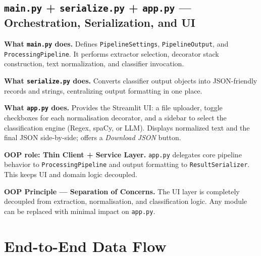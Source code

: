\documentclass[12pt, a4paper]{article}
\begin{document}
\subsection{\texttt{main.py} + \texttt{serialize.py} + \texttt{app.py} --- Orchestration, Serialization, and UI}

\textbf{What \texttt{main.py} does.} Defines \texttt{PipelineSettings},
\texttt{PipelineOutput}, and \texttt{ProcessingPipeline}. It performs
extractor selection, decorator stack construction, text normalization, and
classifier invocation.

\textbf{What \texttt{serialize.py} does.} Converts classifier output objects
into JSON-friendly records and strings, centralizing output formatting in one
place.
 
\textbf{What \texttt{app.py} does.} Provides the Streamlit UI: a file uploader, toggle
checkboxes for each normalisation decorator, and a sidebar to select the
classification engine (Regex, spaCy, or LLM). Displays normalized text and the
final JSON side-by-side; offers a \emph{Download JSON} button.
 
\textbf{OOP role: Thin Client + Service Layer.} \texttt{app.py} delegates core
pipeline behavior to \texttt{ProcessingPipeline} and output formatting to
\texttt{ResultSerializer}. This keeps UI and domain logic decoupled.
 
\begin{mdframed}[style=patternbox]
\textbf{OOP Principle --- Separation of Concerns.} The UI layer is completely
decoupled from extraction, normalisation, and classification logic. Any module
can be replaced with minimal impact on \texttt{app.py}.
\end{mdframed}
 
\section{End-to-End Data Flow}
 
\end{document}
